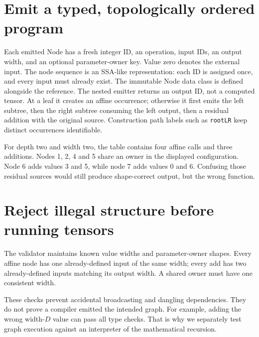 \section{Emit a typed, topologically ordered program}
Each emitted Node has a fresh integer ID, an operation, input IDs,
an output width, and an optional parameter-owner key. Value zero denotes
the external input. The node sequence is an SSA-like representation:
each ID is assigned once, and every input must already exist.
The immutable Node data class is defined alongside the reference.
The nested emitter returns an output ID, not a computed tensor.
At a leaf it creates an affine occurrence; otherwise it first emits the
left subtree, then the right subtree consuming the left output, then a
residual addition with the original source. Construction path labels such
as \texttt{rootLR} keep distinct occurrences identifiable.
\begin{center}\end{center}
For depth two and width two, the table contains four affine calls and three
additions. Nodes 1, 2, 4 and 5 share an owner in the displayed configuration.
Node 6 adds values 3 and 5, while node 7 adds values 0 and 6.
Confusing those residual sources would still produce shape-correct output,
but the wrong function.

\section{Reject illegal structure before running tensors}
The validator maintains known value widths and parameter-owner shapes.
Every affine node has one already-defined input of the same width;
every add has two already-defined inputs matching its output width.
A shared owner must have one consistent width.

These checks prevent accidental broadcasting and dangling dependencies.
They do not prove a compiler emitted the intended graph. For example,
adding the wrong width-$D$ value can pass all type checks.
That is why we separately test graph execution against an interpreter of
the mathematical recursion.


